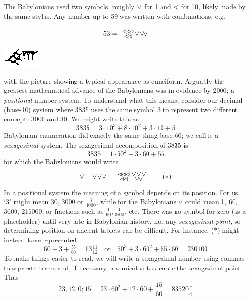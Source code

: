 The Babylonians used two symbols, roughly $\vee$ for 1 and $\sphericalangle$ for 10, likely made by the same stylus. Any number up to 59 was written with combinations, e.g.\par
\begin{minipage}[t]{0.8\linewidth}\vspace{-10pt}
	\[
		53=
		\begin{array}{c}
			\bten\!\bten\!\bten\\[-5pt]
			\bten\!\bten
		\end{array}
		\hspace{-7pt}
		\bone\!\bone\!\bone
	\]
\end{minipage}
\hfill
\begin{minipage}[t]{0.19\linewidth}\vspace{0pt}
	\flushright
	\includegraphics{babylon53}
\end{minipage}
\medbreak
with the picture showing a typical appearance as cuneiform. Arguably the greatest mathematical advance of the Babylonians was in evidence by 2000\BC{}; a \emph{positional} number system. To understand what this means, consider our decimal (base-10) system where 3835 uses the same symbol 3 to represent two different concepts 3000 and 30. We might write this as
\[
	3835=3\cdot 10^3+8\cdot 10^2+3\cdot 10+5
\]
Babylonian enumeration did exactly the same thing base-60; we call it a \emph{sexagesimal} system. The sexagesimal decomposition of 3835 is
\[
	3835=1\cdot 60^2+3\cdot 60+55
\]
for which the Babylonians would write
\[
	\vee\quad \vee\!\vee\!\vee\quad 
	\begin{array}{c}
		\bten\!\bten\!\bten\\[-5pt]
		\bten\!\bten
	\end{array}
	\hspace{-8pt}
	\begin{array}{c}
		\bone\!\bone\!\bone\\[-5pt]
		\bone\!\bone
	\end{array}
	\tag{$\ast$}
\]
In a positional system the meaning of a symbol depends on its position. For us, `3' might mean 30, 3000 or $\frac 3{1000}$, while for the Babylonians $\vee$ could mean 1, 60, 3600, 216000, or fractions such as $\frac 1{60},\frac 1{3600}$, etc. There was no symbol for zero (as a placeholder) until very late in Babylonian history, nor any \emph{sexagesimal point,} so determining position on ancient tablets can be difficult. For instance, ($\ast$) might instead have represented
\[
	60+3+\tfrac{55}{60}=63\tfrac{11}{12}\quad\text{or}\quad 60^3+3\cdot 60^2+55\cdot 60=230100
\]
To make things easier to read, we will write a sexagesimal number using commas to separate terms and, if necessary, a semicolon to denote the sexagesimal point. Thus
\[
	23,12,0;15=23\cdot 60^2+12\cdot 60+\frac{15}{60}=83520\frac 14
\] 

